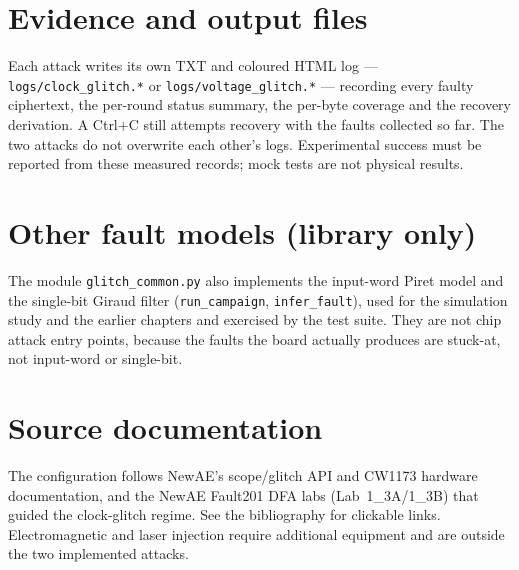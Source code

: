 \section{Evidence and output files}
Each attack writes its own TXT and coloured HTML log --- \texttt{logs/clock\_glitch.*} or \texttt{logs/voltage\_glitch.*} --- recording every faulty ciphertext, the per-round status summary, the per-byte coverage and the recovery derivation. A Ctrl+C still attempts recovery with the faults collected so far. The two attacks do not overwrite each other's logs. Experimental success must be reported from these measured records; mock tests are not physical results.
\section{Other fault models (library only)}
The module \texttt{glitch\_common.py} also implements the input-word Piret model and the single-bit Giraud filter (\texttt{run\_campaign}, \texttt{infer\_fault}), used for the simulation study and the earlier chapters and exercised by the test suite. They are not chip attack entry points, because the faults the board actually produces are stuck-at, not input-word or single-bit.
\section{Source documentation}
The configuration follows NewAE's scope/glitch API and CW1173 hardware documentation, and the NewAE Fault201 DFA labs (Lab~1\_3A/1\_3B) that guided the clock-glitch regime. See the bibliography for clickable links. Electromagnetic and laser injection require additional equipment and are outside the two implemented attacks.
